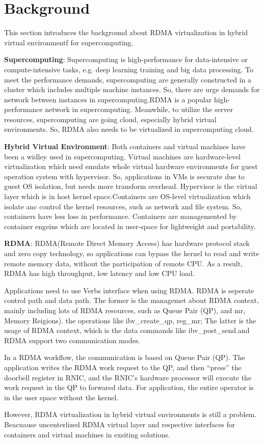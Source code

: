 \section{Background}
This section introduces the background about RDMA virtualization in hybrid virtual environmentf for supercomputing.

\textbf{Supercomputing}: Supercomputing is high-performance for data-intensive or compute-intensive tasks, e.g. deep learning training and big data processing. To meet the performance demands, supercomputing are generally constructed in a cluster which includes multiple machine instances. So, there are urge demands for network between instances in supercomputing.RDMA is a popular high-performance network in supercomputing. Meanwhile, to utilize the server resources, supercomputing are going cloud, especially hybrid virtual environments. So, RDMA also needs to be virtualized in supercomputing cloud.

\textbf{Hybrid Virtual Environment}: Both containers and virtual machines have been a widley used in supercomputing. Virtual machines are hardware-level virtualization which need emulate whole virtual hardware environments for guest operation system with hypervisor. So, applications in VMs is securate due to guest OS isolation, but needs more transform overhead. Hypervisor is the virtual layer which is in host kernel space.Containers are OS-level virtualization which isolate anc control the kernel resources, such as network and file system. So, containers have less loss in performance. Containers are managemented by container engeins which are located in user-space for lightweight and portability.

\textbf{RDMA}: RDMA(Remote Direct Memory Access) has hardware protocol stack and zero copy technology, so applications can bypass the kernel to read and write remote memory data, without the participation of remote CPU. As a result, RDMA has high throughput, low latency and low CPU load.

Applications need to use Verbs interface when using RDMA. RDMA is seperate control path and data path. The former is the managemet about RDMA context, mainly including lots of RDMA resources, such as Queue Pair (QP), and mr, Memory Reigions). the operations like ibv\_create\_qp, reg\_mr; The latter is the usage of RDMA context,  which is the data commands like ibv\_post\_send.and RDMA support two communication modes.

In a RDMA workflow, the communication is based on Queue Pair (QP). The application writes the RDMA work request to the QP, and then ``press''  the doorbell register in RNIC, and the RNIC's hardware processor will execute the work request in the QP to forwared data. For application, the entire operator is in the user space without the kernel.

However, RDMA virtualization in hybrid virtual environments is still a problem. Beacuause uncenterlized RDMA virtual layer and respective interfaces for containers and virtual machines in exsiting solutions. 

